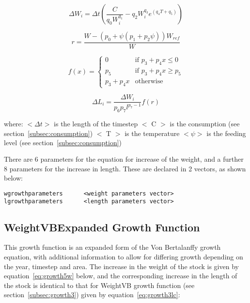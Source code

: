 \documentclass [a4paper, 10pt]{book}
\begin{document}
\begin{equation}\label{eq:growth4w}
\Delta W_{i} = \Delta t \left( \frac{C}{q_{0} W_{i}^{q_{1}}} - q_{2} W_{i}^{q_{3}} e^{(q_{4} T + q_{5})} \right)
\end{equation}

\begin{equation}\label{eq:growth4la}
 r = \frac{W - \left( p_{0} + \psi \left( p_{1} + p_{2}\psi \right) \right) W_{ref}}{W}
\end{equation}

\begin{equation}\label{eq:growth4lb}
f(x) =
\begin{cases}
  0
  & \textrm{if $p_{3} + p_{4}x \leq 0$} \\
  p_{5}
  & \textrm{if $p_{3} + p_{4}x \geq p_{5}$} \\
  p_{3} + p_{4}x
  & \textrm{otherwise}
\end{cases}
\end{equation}

\begin{equation}\label{eq:growth4lc}
\Delta L_{i} = \frac{\Delta W_{i}} {p_{6} p_{7} l^{p_{7} - 1}} f(r)
\end{equation}

where:\newline
$<\Delta t>$ is the length of the timestep\newline
$<$ C $>$ is the consumption (see section~\ref{subsec:consumption})\newline
$<$ T $>$ is the temperature\newline
$<\psi>$ is the feeding level (see section~\ref{subsec:consumption})

\bigskip
There are 6 parameters for the equation for increase of the weight, and a further 8 parameters for the increase in length.  These are declared in 2 vectors, as shown below:

{\small\begin{verbatim}
wgrowthparameters      <weight parameters vector>
lgrowthparameters      <length parameters vector>
\end{verbatim}}

\subsection{WeightVBExpanded Growth Function}\label{subsec:growth5}
This growth function is an expanded form of the Von Bertalanffy growth equation, with additional information to allow for differing growth depending on the year, timestep and area.  The increase in the weight of the stock is given by equation~\ref{eq:growth5w} below, and the corresponding increase in the length of the stock is identical to that for WeightVB growth function (see section~\ref{subsec:growth3}) given by equation~\ref{eq:growth3lc}:
\end{document}

